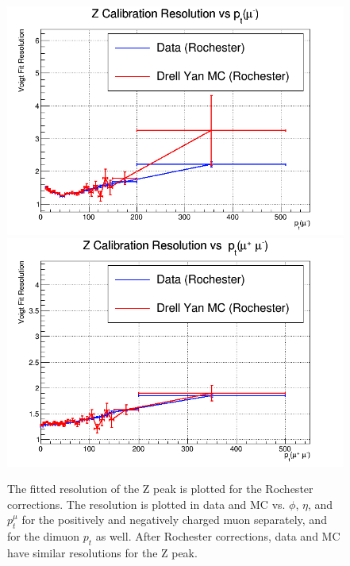 \begin{figure}[!h]
  \includegraphics[width=0.32\linewidth]{images/muon_calib/zcal_roch_mc-data_res_pt_minus.png}
  \includegraphics[width=0.32\linewidth]{images/muon_calib/zcal_roch_mc-data_res_dimu_pt.png}
  \caption[The Z peak resolution's alignment in data and MC after Rochester corrections.]
   {The fitted resolution of the Z peak is plotted for the Rochester corrections. The resolution is plotted in data and MC vs. $\phi$, $\eta$, and $p_t^\mu$ for the positively and negatively charged muon separately, and for the dimuon $p_t$ as well. After Rochester corrections, data and MC have similar resolutions for the Z peak.}
  \label{fig:data_mc_roch_res_after}
\end{figure}
